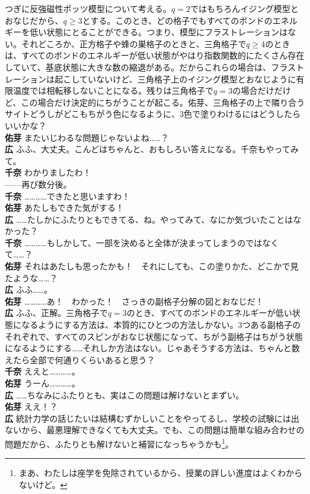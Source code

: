 \documentclass[paper=b5j,fontsize=12Q,jafontsize=12Q,baselineskip=21Q]{jlreq}
\DeclareRobustCommand{\hiron}{\textbf{広 }}
\DeclareRobustCommand{\chinan}{\textbf{千奈 }}
\DeclareRobustCommand{\umen}{\textbf{佑芽 }}
\begin{document}
\begin{refsection}
つぎに反強磁性ポッツ模型について考える。$q=2$ではもちろんイジング模型とおなじだから、$q\ge3$とする。このとき、どの格子でもすべてのボンドのエネルギーを低い状態にとることができる。つまり、模型にフラストレーションはない。それどころか、正方格子や蜂の巣格子のときと、三角格子で$q\ge4$のときは、すべてのボンドのエネルギーが低い状態がやはり指数関数的にたくさん存在していて、基底状態に大きな数の縮退がある。だからこれらの場合は、フラストレーションは起こしていないけど、三角格子上のイジング模型とおなじように有限温度では相転移しないことになる。残りは三角格子で$q=3$の場合だけだけど、この場合だけ決定的にちがうことが起こる。佑芽、三角格子の上で隣り合うサイトどうしがどこもちがう色になるように、3色で塗りわけるにはどうしたらいいかな？
\\\umen またいじわるな問題じゃないよね……？
\\\hiron ふふ、大丈夫。こんどはちゃんと、おもしろい答えになる。千奈もやってみて。
\\\chinan わかりましたわ！
\\
------再び数分後。
\\\chinan …………できたと思いますわ！
\\\umen あたしもできた気がする！
\\\hiron ……たしかにふたりともできてる、ね。やってみて、なにか気づいたことはなかった？
\\\chinan …………もしかして、一部を決めると全体が決まってしまうのではなくて……？
\\\umen それはあたしも思ったかも！　それにしても、この塗りかた、どこかで見たような……？
\\\hiron ふふ……。
\\\umen …………あ！　わかった！　さっきの副格子分解の図とおなじだ！
\\\hiron ふふ、正解。三角格子で$q=3$のとき、すべてのボンドのエネルギーが低い状態になるようにする方法は、本質的にひとつの方法しかない。3つある副格子のそれぞれで、すべてのスピンがおなじ状態になって、ちがう副格子はちがう状態になるようにする……それしか方法はない。じゃあそうする方法は、ちゃんと数えたら全部で何通りくらいあると思う？
\\\chinan ええと…………。
\\\umen うーん…………。
\\\hiron ……ちなみにふたりとも、実はこの問題は解けないとまずい。
\\\umen ええ！？
\\\hiron 統計力学の話じたいは結構むずかしいことをやってるし、学校の試験には出ないから、最悪理解できなくても大丈夫。でも、この問題は簡単な組み合わせの問題だから、ふたりとも解けないと補習になっちゃうかも\footnote{まあ、わたしは座学を免除されているから、授業の詳しい進度はよくわからないけど。}。

\end{refsection}
\end{document}
